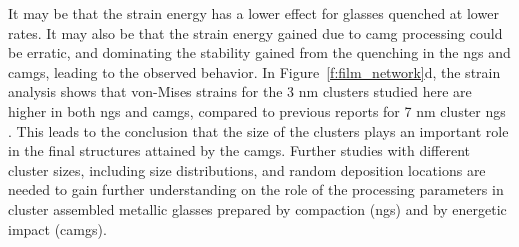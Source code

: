 \begin{changebar}
It may be that the strain energy has a lower effect for glasses quenched at lower rates. It may also be that the strain energy gained due to \gls{camg} processing could be erratic, and dominating the stability gained from the quenching in the \gls{ng}s and \gls{camg}s, leading to the observed behavior. In Figure~\ref{f:film_network}d, the strain analysis shows that von-Mises strains for the 3 nm clusters studied here are higher in both \gls{ng}s and \gls{camg}s, compared to previous reports for 7 nm cluster \gls{ng}s \cite{Adjaoud2018}. This leads to the conclusion that the size of the clusters plays an important role in the final structures attained by the \gls{camg}s. Further studies with different cluster sizes, including size distributions, and random deposition locations are needed to gain further understanding on the role of the processing parameters in cluster assembled metallic glasses prepared by compaction (\gls{ng}s) and by energetic impact (\gls{camg}s).
\end{changebar} \par

%
